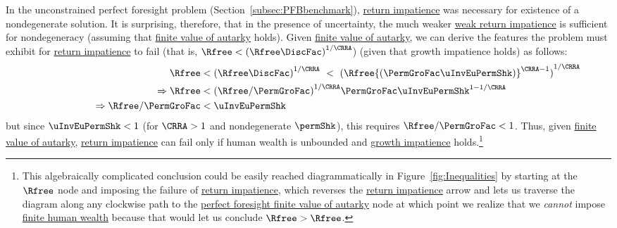 \documentclass[BufferStockTheory]{subfiles}
\begin{document}
In the unconstrained perfect foresight problem (Section~\ref{subsec:PFBbenchmark}), \hyperlink{RIC}{return impatience} was necessary for existence of a nondegenerate solution.
It is surprising, therefore, that in the presence of uncertainty, the much weaker \hyperlink{WRIC}{weak return impatience} is sufficient for nondegeneracy (assuming that \hyperlink{FVAC}{finite value of autarky}  holds).
Given \hyperlink{FVAC}{finite value of autarky}, we can derive the features the problem must exhibit for \hyperlink{RIC}{return impatience} to fail (that is, $\Rfree < {(\Rfree \DiscFac)}^{1/\CRRA}$) (given that growth impatience holds) as follows:
%
\begin{equation}\label{eq:RICimplies}
  \begin{split}
    \Rfree   & < {(\Rfree \DiscFac)}^{1/\CRRA} ~ < ~ {(\Rfree {(\PermGroFac \uInvEuPermShk)}^{\CRRA-1})}^{1/\CRRA}
    \\ \Rightarrow \Rfree   & < {(\Rfree/\PermGroFac)}^{1/\CRRA}\PermGroFac \uInvEuPermShk^{1-1/\CRRA}
    \\  \qquad\qquad\qquad \Rightarrow  \Rfree/\PermGroFac  & < \uInvEuPermShk
  \end{split}
\end{equation}
%
but since $\uInvEuPermShk < 1$ (for $\CRRA>1$ and nondegenerate $\permShk$), this requires $\Rfree/\PermGroFac < 1$.
Thus, given \hyperlink{FVAC}{finite value of autarky}, \hyperlink{RIC}{return impatience} can fail only if human wealth is unbounded and \hyperlink{GIC}{growth impatience} holds.\footnote{This algebraically complicated conclusion could be easily reached diagrammatically in Figure~\ref{fig:Inequalities} by starting at the $\Rfree$ node and imposing the failure of \hyperlink{RIC}{return impatience}, which reverses the \hyperlink{RIC}{return impatience} arrow and lets us traverse the diagram along any clockwise path to the \hyperlink{PFFVAC}{perfect foresight finite value of autarky} node at which point we realize that we \textit{cannot} impose \hyperlink{FHWC}{finite human wealth} because that would let us conclude $\Rfree > \Rfree$.}
\end{document}
